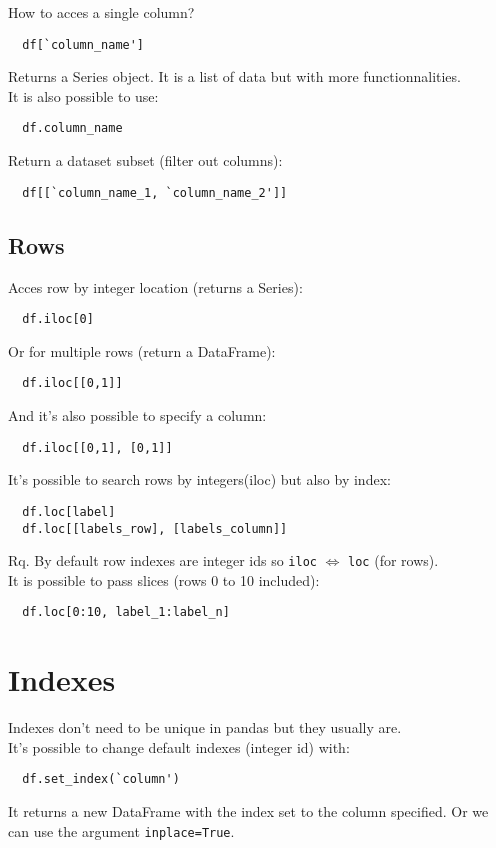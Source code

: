 \documentclass[french]{article}
\begin{document}
How to acces a single column?
\begin{verbatim}
  df[`column_name']
\end{verbatim}
Returns a Series object. It is a list of data but with more functionnalities.\\
It is also possible to use:
\begin{verbatim}
  df.column_name
\end{verbatim}
Return a dataset subset (filter out columns):
\begin{verbatim}
  df[[`column_name_1, `column_name_2']]
\end{verbatim}

\subsection{Rows}
Acces row by integer location (returns a Series):
\begin{verbatim}
  df.iloc[0]
\end{verbatim}
Or for multiple rows (return a DataFrame):
\begin{verbatim}
  df.iloc[[0,1]]
\end{verbatim}
And it's also possible to specify a column:
\begin{verbatim}
  df.iloc[[0,1], [0,1]]
\end{verbatim}
It's possible to search rows by integers(iloc) but also by index:
\begin{verbatim}
  df.loc[label]
  df.loc[[labels_row], [labels_column]]
\end{verbatim}
Rq. By default row indexes are integer ids so \verb|iloc| $\Leftrightarrow$ \verb|loc| (for rows). \\

It is possible to pass slices (rows 0 to 10 included):
\begin{verbatim}
  df.loc[0:10, label_1:label_n]
\end{verbatim}

\section{Indexes}

Indexes don't need to be unique in pandas but they usually are.\\
It's possible to change default indexes (integer id) with:
\begin{verbatim}
  df.set_index(`column')
\end{verbatim}
It returns a new DataFrame with the index set to the column specified. Or we can use the argument \verb|inplace=True|.\\
\end{document}
